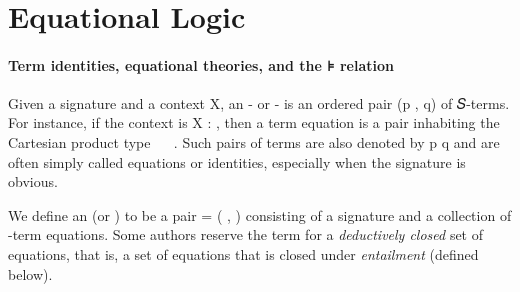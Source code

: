 \begin{code}
\AgdaSpace{}%
\AgdaSpace{}%
\AgdaBound{\AgdaUnderscore{}}\AgdaSpace{}%
\AgdaSpace{}%
\AgdaSymbol{(}\AgdaSpace{}%
\AgdaSymbol{)}\AgdaSpace{}%
\<%
\\
%
\>[1]\AgdaSpace{}%
\AgdaSymbol{(}\AgdaSpace{}%
\AgdaSpace{}%
\AgdaSymbol{)}%
\>[25]\AgdaSymbol{=}\AgdaSpace{}%
\AgdaSpace{}%
%
\>[34]\AgdaSpace{}%
\AgdaSpace{}%
\AgdaSymbol{(}\AgdaSpace{}%
\AgdaSymbol{(}\AgdaSpace{}%
\AgdaSymbol{))}\AgdaSpace{}%
\AgdaSymbol{(}\AgdaSpace{}%
\AgdaSpace{}%
\AgdaOperator{\AgdaInductiveConstructor{,}}\AgdaSpace{}%
\AgdaSpace{}%
\AgdaSpace{}%
\AgdaSpace{}%
\AgdaSpace{}%
\AgdaSpace{}%
\AgdaSymbol{(}\AgdaSpace{}%
\AgdaSymbol{)}\AgdaSpace{}%
\AgdaSpace{}%
\AgdaSpace{}%
\AgdaSymbol{)}\<%
\end{code}
\fi

\section{Equational Logic}
\label{equational-logic}

\paragraph*{Term identities, equational theories, and the ⊧ relation}
Given a signature  and a context \ab X, an - or -
is an ordered pair (\ab p , \ab q) of 𝑆-terms. For instance, if the context is \ab X :
 , then a term equation is a pair inhabiting the Cartesian product type
~  ~. Such pairs of terms are also denoted by \ab p  \ab
q and are often simply called equations or identities, especially when the signature  is obvious.

We define an  (or ) to be a pair  =
( , ) consisting of a signature  and a collection  of
-term equations. Some authors reserve the term  for
a \emph{deductively closed} set of equations, that is, a set of equations that is closed
under \emph{entailment} (defined below).

